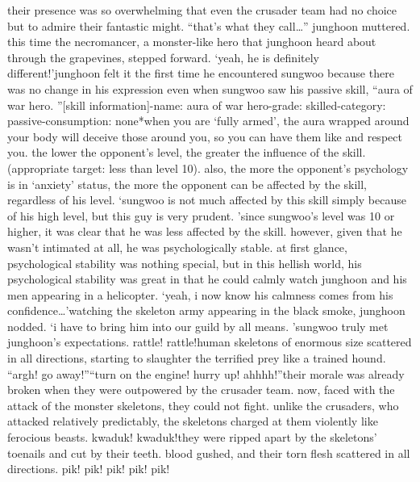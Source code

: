 their presence was so overwhelming that even the crusader team had no choice but to admire their fantastic might.
“that’s what they call…” junghoon muttered.
this time the necromancer, a monster-like hero that junghoon heard about through the grapevines, stepped forward.
‘yeah, he is definitely different!’junghoon felt it the first time he encountered sungwoo because there was no change in his expression even when sungwoo saw his passive skill, “aura of war hero.
”[skill information]-name: aura of war hero-grade: skilled-category: passive-consumption: none*when you are ‘fully armed’, the aura wrapped around your body will deceive those around you, so you can have them like and respect you.
 the lower the opponent’s level, the greater the influence of the skill.
 (appropriate target: less than level 10).
 also, the more the opponent’s psychology is in ‘anxiety’ status, the more the opponent can be affected by the skill, regardless of his level.
‘sungwoo is not much affected by this skill simply because of his high level, but this guy is very prudent.
’since sungwoo’s level was 10 or higher, it was clear that he was less affected by the skill.
 however, given that he wasn’t intimated at all, he was psychologically stable.
at first glance, psychological stability was nothing special, but in this hellish world, his psychological stability was great in that he could calmly watch junghoon and his men appearing in a helicopter.
‘yeah, i now know his calmness comes from his confidence…’watching the skeleton army appearing in the black smoke, junghoon nodded.
‘i have to bring him into our guild by all means.
’sungwoo truly met junghoon’s expectations.
rattle! rattle!human skeletons of enormous size scattered in all directions, starting to slaughter the terrified prey like a trained hound.
“argh! go away!”“turn on the engine! hurry up! ahhhh!”their morale was already broken when they were outpowered by the crusader team.
 now, faced with the attack of the monster skeletons, they could not fight.
unlike the crusaders, who attacked relatively predictably, the skeletons charged at them violently like ferocious beasts.
kwaduk! kwaduk!they were ripped apart by the skeletons’ toenails and cut by their teeth.
blood gushed, and their torn flesh scattered in all directions.
pik! pik! pik! pik! pik!

